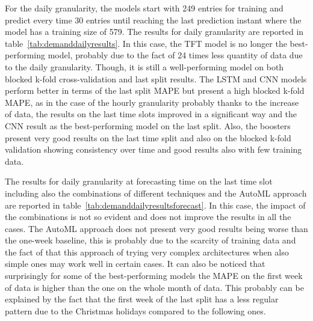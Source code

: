 For the daily granularity, the models start with 249 entries for training and predict every time 30 entries until reaching the last prediction instant where the model has a training size of 579.
The results for daily granularity are reported in table~\ref{tab:demanddailyresults}.
In this case, the TFT model is no longer the best-performing model, probably due to the fact of 24 times less quantity of data due to the daily granularity.
Though, it is still a well-performing model on both blocked k-fold cross-validation and last split results.
The LSTM and CNN models perform better in terms of the last split MAPE but present a high blocked k-fold MAPE, as in the case of the hourly granularity probably thanks to the increase of data, the results on the last time slots improved in a significant way and the CNN result as the best-performing model on the last split.
Also, the boosters present very good results on the last time split and also on the blocked k-fold validation showing consistency over time and good results also with few training data. 

The results for daily granularity at forecasting time on the last time slot including also the combinations of different techniques and the AutoML approach are reported in table~\ref{tab:demanddailyresultsforecast}.
In this case, the impact of the combinations is not so evident and does not improve the results in all the cases.
The AutoML approach does not present very good results being worse than the one-week baseline, this is probably due to the scarcity of training data and the fact of that this approach of trying very complex architectures when also simple ones may work well in certain cases.
It can also be noticed that surprisingly for some of the best-performing models the MAPE on the first week of data is higher than the one on the whole month of data.
This probably can be explained by the fact that the first week of the last split has a less regular pattern due to the Christmas holidays compared to the following ones.

